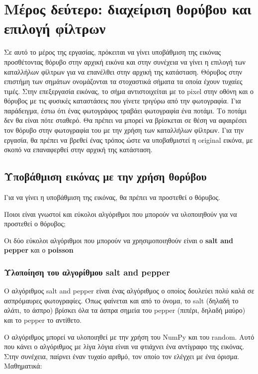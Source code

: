 \label{Chapter2}

\section{Μέρος δεύτερο: διαχείριση θορύβου και επιλογή φίλτρων}

Σε αυτό το μέρος της εργασίας, πρόκειται να γίνει υποβάθμιση της εικόνας προσθέτοντας θόρυβο στην αρχική εικόνα και στην συνέχεια να γίνει η επιλογή των καταλλήλων φίλτρων για να επανέλθει στην αρχική της κατάσταση.
Θόρυβος στην επιστήμη των σημάτων ονομάζονται τα στοχαστικά σήματα τα οποία έχουν τυχαίες τιμές.
Στην επεξεργασία εικόνας, το σήμα αντιστοιχείται με το pixel στην οθόνη και ο θόρυβος με τις φυσικές καταστάσεις που γίνετε τριγύρω από την φωτογραφία.
Για παράδειγμα, έστω ότι ένας φωτογράφος τραβάει φωτογραφία ένα ποτάμι. Το ποτάμι δεν θα είναι πότε σταθερό.
Θα πρέπει να μπορεί να βρίσκεται σε θέση να αφαιρέσει τον θόρυβο στην φωτογραφία του με την χρήση των καταλλήλων φίλτρων.
Για την εργασία, θα πρέπει να βρεθεί ένας τρόπος ώστε να υποβαθμιστεί η original εικόνα, με σκοπό να επαναφερθεί στην αρχική της κατάσταση.

\subsection{Υποβάθμιση εικόνας με την χρήση θορύβου}

Για να γίνει η υποβάθμιση της εικόνας, θα πρέπει να προστεθεί ο θόρυβος.

\begin{problem}
  Ποιοι είναι γνωστοί και εύκολοι αλγόριθμοι που μπορούν να υλοποιηθούν για να προστεθεί ο θόρυβος;
\end{problem}

Οι δύο εύκολοι αλγόριθμοι που μπορούν να χρησιμοποιηθούν είναι ο \textbf{salt and pepper} και ο \textbf{poisson}

\subsubsection{Υλοποίηση του αλγορίθμου salt and pepper}

Ο αλγόριθμος salt and pepper είναι ένας αλγόριθμος ο οποίος δουλεύει πολύ καλά σε ασπρόμαυρες φωτογραφίες.
Όπως φαίνεται και από το όνομα, το salt (δηλαδή το αλάτι, το άσπρο) βρίσκει όλα τα άσπρα σημεία του pepper (πιπέρι, δηλαδή μαύρο) και το pepper το αντίθετο. \par
Ο αλγόριθμος μπορεί να υλοποιηθεί με την χρήση του NumPy και του random. Αυτό που κάνει ο αλγόριθμος με λίγα λόγια είναι να φτιάχνει ένα αντίγραφο της εικόνας.
Στην συνέχεια, παίρνει έναν τυχαίο αριθμό, τον οποίο τον ελέγχει με ένα όρισμα. Μαθηματικά:

